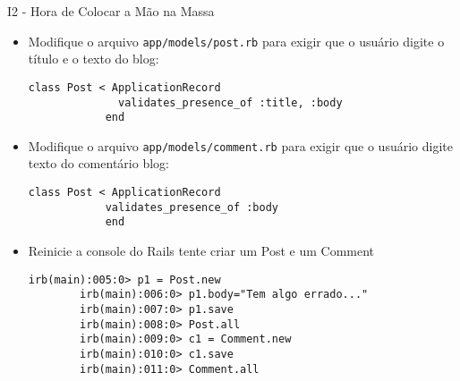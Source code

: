 \begin{frame}{I2 - Hora de Colocar a Mão na Massa}
	\begin{itemize}
			
		\item Modifique o arquivo \verb|app/models/post.rb| para exigir 
			que o usuário digite o título e o texto do blog:
		\begin{lstlisting}[style=RubyInputStyle]
			class Post < ApplicationRecord
			  validates_presence_of :title, :body
			end
		\end{lstlisting}
		
		\item Modifique o arquivo \verb|app/models/comment.rb| para exigir 
		que o usuário digite texto do comentário blog:
		\begin{lstlisting}[style=RubyInputStyle]
			class Post < ApplicationRecord
		    validates_presence_of :body
			end
		\end{lstlisting}
		
		\item \alert{Reinicie} a console do Rails tente criar um Post e um Comment
\begin{lstlisting}[style=BashInputBasicStyle]
		irb(main):005:0> p1 = Post.new
		irb(main):006:0> p1.body="Tem algo errado..."
		irb(main):007:0> p1.save
		irb(main):008:0> Post.all
		irb(main):009:0> c1 = Comment.new
		irb(main):010:0> c1.save
		irb(main):011:0> Comment.all
\end{lstlisting}	
	\end{itemize}
\end{frame}